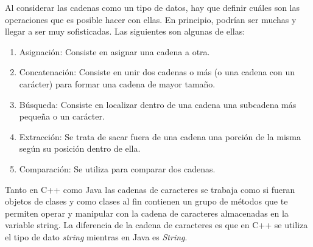 Al considerar las cadenas como un tipo de datos, hay que definir cuáles son las operaciones que es posible hacer con ellas. En principio, podrían ser muchas y llegar a ser muy sofisticadas. Las siguientes son algunas de ellas:

\begin{enumerate}
	\item Asignación: Consiste en asignar una cadena a otra.
	\item Concatenación: Consiste en unir dos cadenas o más (o una cadena con un carácter) para formar una cadena de mayor tamaño.
	\item Búsqueda: Consiste en localizar dentro de una cadena una subcadena más pequeña o un carácter.
	\item Extracción: Se trata de sacar fuera de una cadena una porción de la misma según su posición dentro de ella.
	\item Comparación: Se utiliza para comparar dos cadenas.
\end{enumerate}

Tanto en C++ como Java las cadenas de caracteres se trabaja como si fueran objetos de clases y como clases al fin contienen un grupo de métodos que te permiten operar y manipular con la cadena de caracteres almacenadas en la variable string. La diferencia de la cadena de caracteres es que en C++ se utiliza el tipo de dato \emph{string} mientras en Java es \emph{String}.